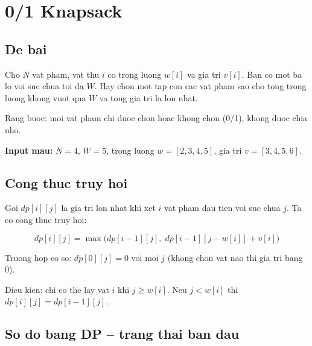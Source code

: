 \section{0/1 Knapsack}

\subsection{De bai}

Cho $N$ vat pham, vat thu $i$ co trong luong $w[i]$ va gia tri $v[i]$.
Ban co mot ba lo voi suc chua toi da $W$.
Hay chon mot tap con cac vat pham sao cho tong trong luong khong vuot qua $W$
va tong gia tri la lon nhat.

Rang buoc: moi vat pham chi duoc chon hoac khong chon (0/1), khong duoc chia nho.

\textbf{Input mau:} $N = 4$, $W = 5$, trong luong $w = [2, 3, 4, 5]$, gia tri $v = [3, 4, 5, 6]$.

\subsection{Cong thuc truy hoi}

Goi $dp[i][j]$ la gia tri lon nhat khi xet $i$ vat pham dau tien voi suc chua $j$.
Ta co cong thuc truy hoi:

$$
dp[i][j] = \max\bigl(dp[i-1][j],\; dp[i-1][j - w[i]] + v[i]\bigr)
$$

Truong hop co so: $dp[0][j] = 0$ voi moi $j$ (khong chon vat nao thi gia tri bang $0$).

Dieu kien: chi co the lay vat $i$ khi $j \geq w[i]$. Neu $j < w[i]$ thi $dp[i][j] = dp[i-1][j]$.

\subsection{So do bang DP -- trang thai ban dau}

\begin{diagram}[id="knapsack-init"]
\end{diagram}

